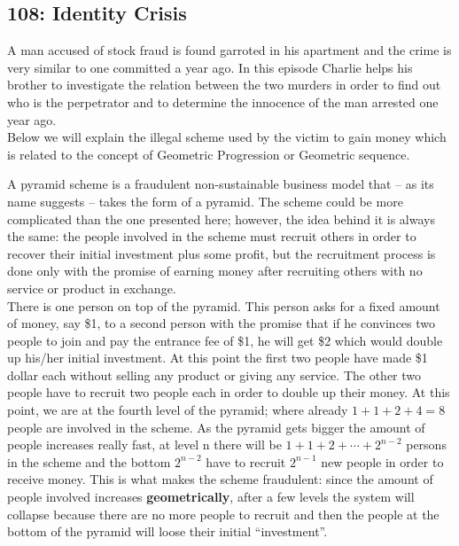 \newpage
\subsection{108: Identity Crisis\label{108}}

A man accused of stock fraud is found garroted in his apartment and the crime is very similar to one committed a year ago. In this episode Charlie helps his brother to investigate the relation between the two murders in order to find out who is the perpetrator and to determine the innocence of the man arrested one year ago. \\

Below we will explain the illegal scheme used by the victim to gain money which is related to the concept of Geometric Progression or Geometric sequence. \\


A pyramid scheme is a fraudulent non-sustainable business model that -- as its name suggests -- takes the form of a pyramid. The scheme could be more complicated than the one presented here; however, the idea behind it is always the same: the people involved in the scheme must recruit others in order to recover their initial investment plus some profit, but the recruitment process is done only with the promise of earning money after recruiting others with no service or product in exchange. \\

 There is one person on top of the pyramid. This person asks for a fixed amount of money, say \$1, to a second person with the promise that if he convinces two people to join and pay the entrance fee of \$1, he will get \$2 which would double up his/her initial investment. At this point the first two people have made \$1 dollar each without selling any product or giving any service. The other two people have to recruit two people each in order to double up their money. At this point, we are at the fourth level of the pyramid; where already $1+1+2+4=8$ people are involved in the scheme. As the pyramid gets bigger the amount of people increases really fast, at level n there will be $1+1+2+\cdots+2^{n-2}$ persons in the scheme and the bottom $2^{n-2}$ have to recruit $2^{n-1}$ new people in order to receive money. This is what makes the scheme fraudulent: since the amount of people involved increases \textbf{geometrically}, after a few levels the system will collapse because there are no more people to recruit and then the people at the bottom of the pyramid will loose their initial ``investment''. \\

